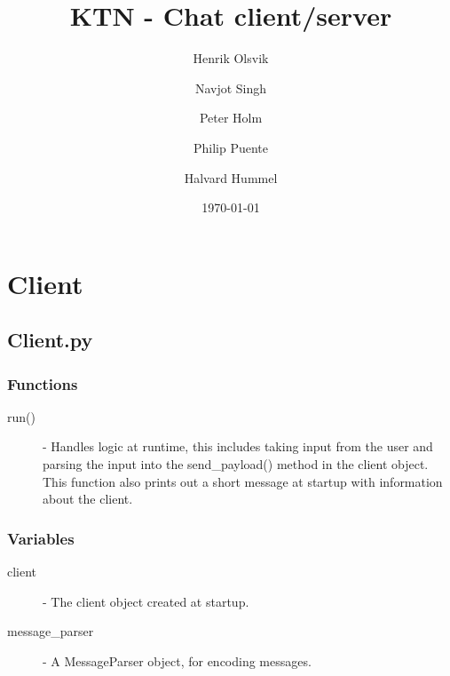 \documentclass[a4paper, 12pt]{article}
\title{KTN - Chat client/server}
\author{Henrik Olsvik
        \and Navjot Singh
        \and Peter Holm
        \and Philip Puente
        \and Halvard Hummel}
\date{\today}
\begin{document}
\maketitle

\section{Client}
    \subsection{Client.py}
        \subsubsection{Functions}
            \begin{description}
                \item[run()] - Handles logic at runtime, this includes taking input from the user and parsing the input into the send\_payload() method in the client object. This function also prints out a short message at startup with information about the client.
            \end{description}
        \subsubsection{Variables}
            \begin{description}
                \item[client] - The client object created at startup.
                \item[message\_parser] - A MessageParser object, for encoding messages.
            \end{description}
\end{document}
